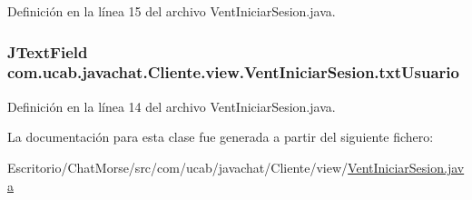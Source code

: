 Definición en la línea 15 del archivo Vent\-Iniciar\-Sesion.\-java.

\hypertarget{classcom_1_1ucab_1_1javachat_1_1_cliente_1_1view_1_1_vent_iniciar_sesion_a6605fb227c982704cea8d29e26209d95}{
\subsubsection[{txt\-Usuario}]{\setlength{\rightskip}{0pt plus 5cm}J\-Text\-Field com.\-ucab.\-javachat.\-Cliente.\-view.\-Vent\-Iniciar\-Sesion.\-txt\-Usuario}}\label{classcom_1_1ucab_1_1javachat_1_1_cliente_1_1view_1_1_vent_iniciar_sesion_a6605fb227c982704cea8d29e26209d95}


Definición en la línea 14 del archivo Vent\-Iniciar\-Sesion.\-java.



La documentación para esta clase fue generada a partir del siguiente fichero\-:\begin{DoxyCompactItemize}
\item 
Escritorio/\-Chat\-Morse/src/com/ucab/javachat/\-Cliente/view/\hyperlink{_vent_iniciar_sesion_8java}{Vent\-Iniciar\-Sesion.\-java}\end{DoxyCompactItemize}
